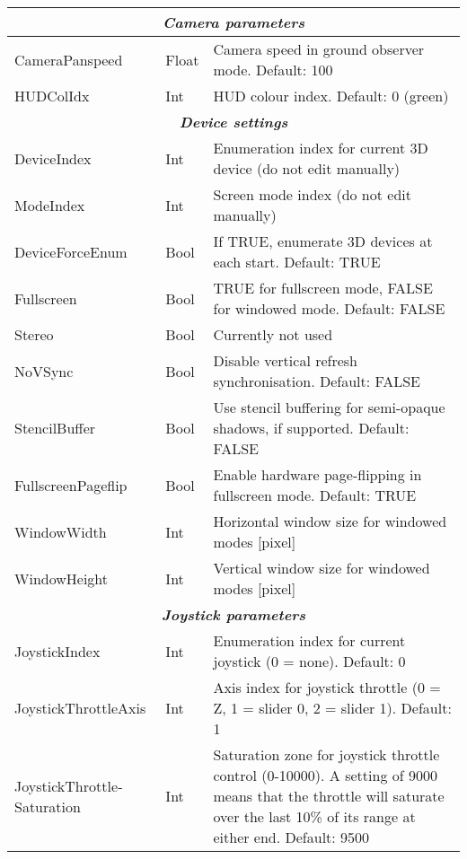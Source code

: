 \documentclass[Orbiter User Manual.tex]{subfiles}
\begin{document}
\begin{longtable}{ |p{}|p{}|p{}| }
	\hline
	\multicolumn{3}{|c|}{\rule{0pt}{2ex}\textbf{\textit{Camera parameters}}}\\
	\hline\rule{0pt}{2ex}
	CameraPanspeed & Float & Camera speed in ground observer mode. Default: 100\\
	\hline\rule{0pt}{2ex}
	HUDColIdx & Int & HUD colour index. Default: 0 (green)\\
	\hline
	\multicolumn{3}{|c|}{\rule{0pt}{2ex}\textbf{\textit{Device settings}}}\\
	\hline\rule{0pt}{2ex}
	DeviceIndex & Int & Enumeration index for current 3D device (do not edit manually)\\
	\hline\rule{0pt}{2ex}
	ModeIndex & Int & Screen mode index (do not edit manually)\\
	\hline\rule{0pt}{2ex}
	DeviceForceEnum & Bool & If TRUE, enumerate 3D devices at each start. Default: TRUE\\
	\hline\rule{0pt}{2ex}
	Fullscreen & Bool & TRUE for fullscreen mode, FALSE for windowed mode. Default: FALSE\\
	\hline\rule{0pt}{2ex}
	Stereo & Bool & Currently not used\\
	\hline\rule{0pt}{2ex}
	NoVSync & Bool & Disable vertical refresh synchronisation. Default: FALSE\\
	\hline\rule{0pt}{2ex}
	StencilBuffer & Bool & Use stencil buffering for semi-opaque shadows, if supported. Default: FALSE\\
	\hline\rule{0pt}{2ex}
	FullscreenPageflip & Bool & Enable hardware page-flipping in fullscreen mode. Default: TRUE\\
	\hline\rule{0pt}{2ex}
	WindowWidth & Int & Horizontal window size for windowed modes [pixel]\\
	\hline\rule{0pt}{2ex}
	WindowHeight & Int & Vertical window size for windowed modes [pixel]\\
	\hline
	\multicolumn{3}{|c|}{\rule{0pt}{2ex}\textbf{\textit{Joystick parameters}}}\\
	\hline\rule{0pt}{2ex}
	JoystickIndex & Int & Enumeration index for current joystick (0 = none). Default: 0\\
	\hline\rule{0pt}{2ex}
	JoystickThrottleAxis & Int & Axis index for joystick throttle (0 = Z, 1 = slider 0, 2 = slider 1). Default: 1\\
	\hline\rule{0pt}{2ex}
	JoystickThrottle­Saturation & Int & Saturation zone for joystick throttle control (0-10000). A setting of 9000 means that the throttle will saturate over the last 10\% of its range at either end. Default: 9500\\

\end{longtable}
\end{document}
